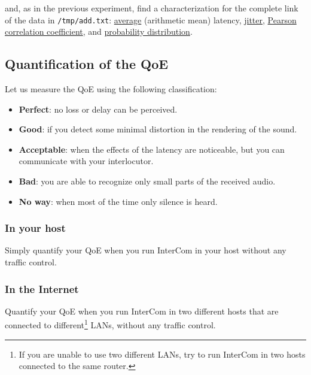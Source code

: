 \begin{enumerate}

  and, as in the previous experiment, find a
  characterization for the complete link of the data in \verb|/tmp/add.txt|:
  \href{https://en.wikipedia.org/wiki/Average}{average} (arithmetic
  mean) latency, \href{https://en.wikipedia.org/wiki/Jitter}{jitter},
  \href{https://en.wikipedia.org/wiki/Pearson_correlation_coefficient}{Pearson
    correlation coefficient}, and
  \href{https://en.wikipedia.org/wiki/List_of_probability_distributions}{probability
    distribution}.

\end{enumerate}

\subsection{Quantification of the QoE}

Let us measure the QoE using the following classification:
\begin{itemize}
\item \textbf{Perfect}: no loss or delay can be perceived.
\item \textbf{Good}: if you detect some minimal distortion in the
  rendering of the sound.
\item \textbf{Acceptable}: when the effects of the latency are
  noticeable, but you can communicate with your interlocutor.
\item \textbf{Bad}: you are able to recognize only small parts of the
  received audio.
\item \textbf{No way}: when most of the time only silence is heard.
\end{itemize}

\subsubsection{In your host}

Simply quantify your QoE when you run InterCom in your host without
any traffic control.

\subsubsection{In the Internet}

Quantify your QoE when you run InterCom in two different hosts that
are connected to different\footnote{If you are unable to use two
  different LANs, try to run InterCom in two hosts connected
  to the same router.} LANs, without any traffic control.

